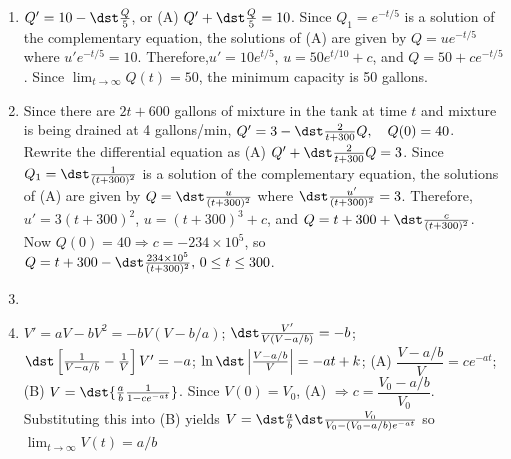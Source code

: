 \documentclass[openany]{book}
\newenvironment{sectionSolutions}{
 \begin{enumerate}[item-label={\thesection.\arabic{enumi}.}]
}{
 \end{enumerate}
}
\begin{document}
\begin{sectionSolutions}
\item
$Q'=10-\dst\frac{Q}{5}$, or
 (A) $Q'+\dst\frac{Q}{5}=10$. Since $Q_1=e^{-t/5}$ is a solution
of the complementary equation, the solutions of (A) are given by
$Q=ue^{-t/5}$ where $u'e^{-t/5}=10$. Therefore,$u'=10e^{t/5}$,
$u=50e^{t/10}+c$, and $Q=50+ce^{-t/5}$. Since
$\lim_{t\to\infty}Q(t)=50$, the minimum capacity is 50 gallons.



\item
 Since there are $2t+600$ gallons of mixture in the tank at
time $t$ and mixture is being drained at 4
gallons/min, $Q'=3-\dst\frac{2}{ t+300}Q,\quad Q(0)=40$.
 Rewrite the differential
equation
as (A) $Q'+\dst\frac{2}{ t+300}Q=3$. Since $Q_1=\dst\frac{1}{(t+300)^2}$
is a
solution of the complementary equation, the solutions of (A) are given
by
$Q=\dst\frac{u}{(t+300)^2}$ where $\dst\frac{u'}{(t+300)^2}=3$. Therefore,
$u'=3(t+300)^2$,
$u=(t+300)^3+c$, and $Q=t+300+\dst\frac{c}{(t+300)^2}$.
 Now
$Q(0)=40\Rightarrow c=-234\times10^5$, so
 $Q= t+300-\dst\frac{234 \times 10^5}{(t+300)^2},
\, 0\le t\le300$.



\item
{}

\item
$V'=aV-bV^2=-bV(V-b/a)$; $\dst\frac{V'}{ V(V-a/b)}=-b$;
$\dst\left[\frac{1}{ V-a/b}-\frac{1}{ V}\right]V'=-a$;
$\ln\dst\left|\frac{V-a/b}{ V}\right|=-at+k$; (A) $\dfrac{V-a/b}{
V}=ce^{-at}$; (B) $V=\dst{\frac{a}{ b}\frac{1}{1-ce^{-at}}}$. Since
$V(0)=V_0$,  (A) $\Rightarrow c=\dfrac{V_0-a/b}{ V_0}$. Substituting
this into (B) yields
$V=\dst\frac{a}{ b}\dst\frac{V_0}{ V_0-\left(V_0-a/b
\right)e^{-at}}$ so $\lim_{t\to\infty}V(t)=a/b$


\end{sectionSolutions}
\end{document}
